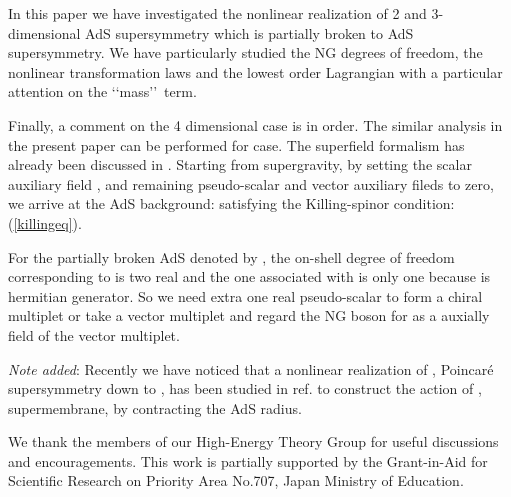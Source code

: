 \documentclass[a4paper,12pt]{article}
\begin{document}
\vspace{0.3cm}
\vspace{0.3cm}

In this paper we have investigated the nonlinear realization of 
2 and 3-dimensional \coordHE{} AdS supersymmetry which is partially broken
to \coordHE{} AdS supersymmetry. We have particularly studied the NG degrees
of freedom, the nonlinear transformation laws and the lowest order 
Lagrangian with a particular attention on the \lq\lq mass\rq\rq\  term. 

Finally, a comment on the 4 dimensional case is in order.
The similar analysis in the present paper can be performed for \coordHE{}
case. The superfield formalism has already been discussed in \cite{IS}. 
Starting from \coordHE{} supergravity, by setting the scalar auxiliary field
\coordHE{}, and remaining pseudo-scalar and vector auxiliary fileds to
zero, we arrive at the AdS background: \coordHE{} satisfying the
Killing-spinor condition: (\ref{killingeq}).

For the partially broken \coordHE{} AdS denoted by \coordHE{}, 
the on-shell degree of freedom corresponding to 
\coordHE{} is two real and the one associated with \coordHE{} is only one because \coordHE{}
is hermitian \coordHE{} generator. So we need extra one real pseudo-scalar to form
a chiral multiplet or take a vector multiplet and regard the NG boson for \coordHE{}
as a auxially field of the vector multiplet. 

\vspace{0.3cm}

{\it Note added}: Recently we have noticed that a nonlinear realization of
\coordHE{}, \coordHE{} Poincar{\'e} supersymmetry down to \coordHE{}, \coordHE{} has been
studied in ref.\cite{EK} to construct the action of \coordHE{}, \coordHE{} 
supermembrane, by contracting the AdS radius. 


\newpage
\vspace{0.3cm}
\vspace{0.3cm}
We thank the members of our High-Energy Theory Group for useful discussions
and encouragements. This work is partially supported by the Grant-in-Aid
for Scientific Research on Priority Area No.707, Japan Ministry of Education.
 
\end{document}
